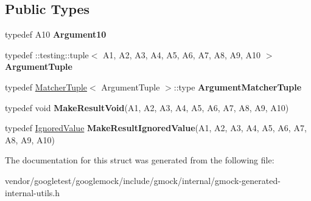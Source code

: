\subsection*{Public Types}
\begin{DoxyCompactItemize}
\item 
\mbox{\label{structtesting_1_1internal_1_1_function_3_01_r_07_a1_00_01_a2_00_01_a3_00_01_a4_00_01_a5_00_01_a6f6ff91550f0557b7708e490e5002cd35_a74022db8f1642276a1a9033da16cc2f5}} 
typedef A10 {\bfseries Argument10}
\item 
\mbox{\label{structtesting_1_1internal_1_1_function_3_01_r_07_a1_00_01_a2_00_01_a3_00_01_a4_00_01_a5_00_01_a6f6ff91550f0557b7708e490e5002cd35_a38b8a4911806458eacc69740d4638d87}} 
typedef \+::testing\+::tuple$<$ A1, A2, A3, A4, A5, A6, A7, A8, A9, A10 $>$ {\bfseries Argument\+Tuple}
\item 
\mbox{\label{structtesting_1_1internal_1_1_function_3_01_r_07_a1_00_01_a2_00_01_a3_00_01_a4_00_01_a5_00_01_a6f6ff91550f0557b7708e490e5002cd35_ad2418eacffea2e3cc5466c93b1fd7002}} 
typedef \hyperlink{structtesting_1_1internal_1_1_matcher_tuple}{Matcher\+Tuple}$<$ Argument\+Tuple $>$\+::type {\bfseries Argument\+Matcher\+Tuple}
\item 
\mbox{\label{structtesting_1_1internal_1_1_function_3_01_r_07_a1_00_01_a2_00_01_a3_00_01_a4_00_01_a5_00_01_a6f6ff91550f0557b7708e490e5002cd35_aa0f1fef89e59875917d08ba584b05186}} 
typedef void {\bfseries Make\+Result\+Void}(A1, A2, A3, A4, A5, A6, A7, A8, A9, A10)
\item 
\mbox{\label{structtesting_1_1internal_1_1_function_3_01_r_07_a1_00_01_a2_00_01_a3_00_01_a4_00_01_a5_00_01_a6f6ff91550f0557b7708e490e5002cd35_a4e905802374219aa3e556ccc65191098}} 
typedef \hyperlink{classtesting_1_1internal_1_1_ignored_value}{Ignored\+Value} {\bfseries Make\+Result\+Ignored\+Value}(A1, A2, A3, A4, A5, A6, A7, A8, A9, A10)
\end{DoxyCompactItemize}


The documentation for this struct was generated from the following file\+:\begin{DoxyCompactItemize}
\item 
vendor/googletest/googlemock/include/gmock/internal/gmock-\/generated-\/internal-\/utils.\+h\end{DoxyCompactItemize}
